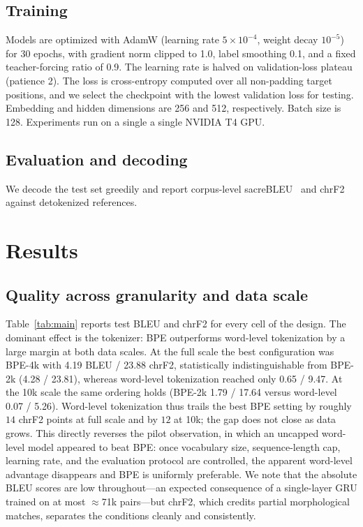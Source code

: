\documentclass[conference]{IEEEtran}
\begin{document}
\subsection{Training}
Models are optimized with AdamW (learning rate $5\times10^{-4}$, weight decay
$10^{-5}$) for 30 epochs, with gradient norm clipped to 1.0, label smoothing
0.1, and a fixed teacher-forcing ratio of 0.9. The learning rate is halved on
validation-loss plateau (patience 2). The loss is cross-entropy computed over all
non-padding target positions, and we select the checkpoint with the lowest
validation loss for testing. Embedding and hidden dimensions are 256 and 512,
respectively. Batch size is 128. Experiments run on a single
a single NVIDIA T4 GPU.

\subsection{Evaluation and decoding}
We decode the test set greedily and report corpus-level
sacreBLEU~\cite{post2018} and chrF2~\cite{popovic2015} against detokenized
references.

\section{Results}
\subsection{Quality across granularity and data scale}
Table~\ref{tab:main} reports test BLEU and chrF2 for every cell of the design.
The dominant effect is the tokenizer: BPE outperforms word-level tokenization by
a large margin at both data scales. At the full scale the best configuration was
BPE-4k with 4.19 BLEU / 23.88 chrF2, statistically indistinguishable from BPE-2k
(4.28 / 23.81), whereas word-level tokenization reached only 0.65 / 9.47. At the
10k scale the same ordering holds (BPE-2k 1.79 / 17.64 versus word-level
0.07 / 5.26). Word-level tokenization thus trails the best BPE setting by roughly
$14$ chrF2 points at full scale and by $12$ at 10k; the gap does not close as
data grows. This directly reverses the pilot observation, in which an uncapped
word-level model appeared to beat BPE: once vocabulary size, sequence-length cap,
learning rate, and the evaluation protocol are controlled, the apparent
word-level advantage disappears and BPE is uniformly preferable. We note that the
absolute BLEU scores are low throughout---an expected consequence of a
single-layer GRU trained on at most $\approx$71k pairs---but chrF2, which credits
partial morphological matches, separates the conditions cleanly and consistently.
\end{document}
